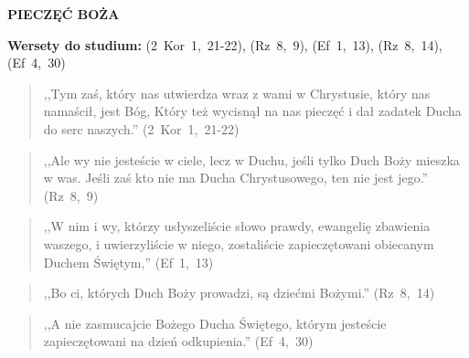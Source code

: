 \documentclass[10pt,a4paper,oneside]{article}
\begin{document}
\centerline{\textbf{\MakeUppercase{Pieczęć Boża}}}
\begin{center}
\textbf{Wersety do studium:} (2~Kor~1,~21-22), (Rz~8,~9), (Ef~1,~13), (Rz~8,~14), (Ef~4,~30)
\end{center}
\begin{quote}
,,Tym zaś, który nas utwierdza wraz z wami w Chrystusie, który nas namaścił, jest Bóg, Który też wycisnął na nas pieczęć i dał zadatek Ducha do serc naszych.'' (2~Kor~1,~21-22)
\end{quote}
\begin{quote}
,,Ale wy nie jesteście w ciele, lecz w Duchu, jeśli tylko Duch Boży mieszka w was. Jeśli zaś kto nie ma Ducha Chrystusowego, ten nie jest jego.'' (Rz~8,~9)
\end{quote}
\begin{quote}
,,W nim i wy, którzy usłyszeliście słowo prawdy, ewangelię zbawienia waszego, i uwierzyliście w niego, zostaliście zapieczętowani obiecanym Duchem Świętym,'' (Ef~1,~13)
\end{quote}
\begin{quote}
,,Bo ci, których Duch Boży prowadzi, są dziećmi Bożymi.'' (Rz~8,~14)
\end{quote}
\begin{quote}
,,A nie zasmucajcie Bożego Ducha Świętego, którym jesteście zapieczętowani na dzień odkupienia.'' (Ef~4,~30)
\end{quote}
\end{document}
